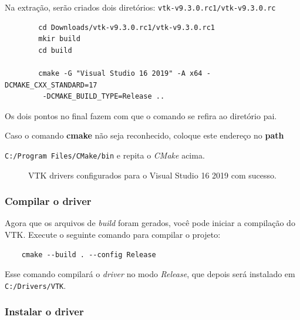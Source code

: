\documentclass[a4paper,11pt]{article}
\newcommand{\cmake}{\textit{CMake}}
\begin{document}
Na extração, serão criados dois diretórios: {\tt vtk-v9.3.0.rc1/vtk-v9.3.0.rc}

\begin{mdframed}
	\begin{verbatim}
		cd Downloads/vtk-v9.3.0.rc1/vtk-v9.3.0.rc1
		mkir build
		cd build
		
		cmake -G "Visual Studio 16 2019" -A x64 -DCMAKE_CXX_STANDARD=17
		 -DCMAKE_BUILD_TYPE=Release ..
	\end{verbatim}
\end{mdframed}

Os dois pontos no final fazem com que o comando se refira ao diretório pai.

Caso o comando \textbf{cmake} não seja reconhecido, coloque este endereço no \textbf{path}

{\tt C:/Program Files/CMake/bin} e repita o \cmake{} acima.

\begin{figure}[H]
	\centering
	\caption{VTK drivers configurados para o Visual Studio 16 2019 com sucesso.}
	\label{fig:vtk_make}
\end{figure}

\subsubsection{Compilar o driver}

Agora que os arquivos de \textit{build} foram gerados, você pode iniciar a compilação do VTK. Execute o seguinte comando para compilar o projeto:
\begin{mdframed}
	\begin{verbatim}
	cmake --build . --config Release 
	\end{verbatim}
\end{mdframed}

Esse comando compilará o \textit{driver} no modo \textit{Release}, que depois será instalado em {\tt C:/Drivers/VTK}.

\subsubsection{Instalar o driver}
\end{document}
